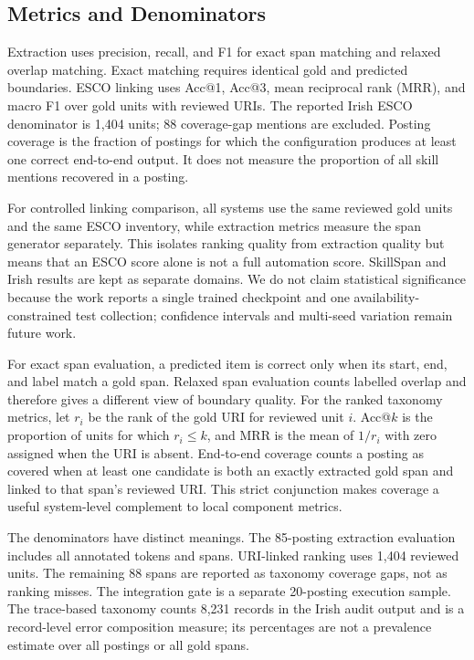 \documentclass[conference]{IEEEtran}
\begin{document}
\subsection{Metrics and Denominators}
Extraction uses precision, recall, and F1 for exact span matching and relaxed overlap matching. Exact matching requires identical gold and predicted boundaries. ESCO linking uses Acc@1, Acc@3, mean reciprocal rank (MRR), and macro F1 over gold units with reviewed URIs. The reported Irish ESCO denominator is 1,404 units; 88 coverage-gap mentions are excluded. Posting coverage is the fraction of postings for which the configuration produces at least one correct end-to-end output. It does not measure the proportion of all skill mentions recovered in a posting.

For controlled linking comparison, all systems use the same reviewed gold units and the same ESCO inventory, while extraction metrics measure the span generator separately. This isolates ranking quality from extraction quality but means that an ESCO score alone is not a full automation score. SkillSpan and Irish results are kept as separate domains. We do not claim statistical significance because the work reports a single trained checkpoint and one availability-constrained test collection; confidence intervals and multi-seed variation remain future work.

For exact span evaluation, a predicted item is correct only when its start, end, and label match a gold span. Relaxed span evaluation counts labelled overlap and therefore gives a different view of boundary quality. For the ranked taxonomy metrics, let $r_i$ be the rank of the gold URI for reviewed unit $i$. Acc@$k$ is the proportion of units for which $r_i\leq k$, and MRR is the mean of $1/r_i$ with zero assigned when the URI is absent. End-to-end coverage counts a posting as covered when at least one candidate is both an exactly extracted gold span and linked to that span's reviewed URI. This strict conjunction makes coverage a useful system-level complement to local component metrics.

The denominators have distinct meanings. The 85-posting extraction evaluation includes all annotated tokens and spans. URI-linked ranking uses 1,404 reviewed units. The remaining 88 spans are reported as taxonomy coverage gaps, not as ranking misses. The integration gate is a separate 20-posting execution sample. The trace-based taxonomy counts 8,231 records in the Irish audit output and is a record-level error composition measure; its percentages are not a prevalence estimate over all postings or all gold spans.
\end{document}
